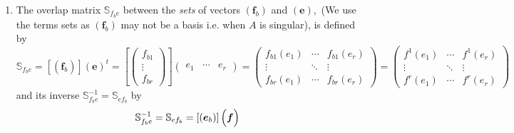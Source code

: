 \documentclass[aps,preprint]{revtex4}
\begin{document}
\begin{enumerate}
\begin{enumerate}
\begin{equation}
\begin{array}{ccc}
\vdots & \ddots & \vdots \\ 
e_{bbr}\left( f_{b1}\right) & \cdots & e_{bbr}\left( f_{b1}\right)%
\end{array}%
\right) =\left( 
\begin{array}{ccc}
f_{b1}\left( e_{1}\right) & \cdots & f_{b1}\left( e_{r}\right) \\ 
\vdots & \ddots & \vdots \\ 
f_{br}\left( e_{1}\right) & \cdots & f_{br}\left( e_{r}\right)%
\end{array}%
\right) =\mathcal{R}_{e}\left( A\right) .
\end{equation}

\item The overlap matrix $\mathbb{S}_{f_{b}e}$ between the \emph{sets} of
vectors $\left( \boldsymbol{f}_{b}\right) $ and $\left( \boldsymbol{e}%
\right) ,$ (We use the terms sets as $\left( \boldsymbol{f}_{b}\right) $ may
not be a basis i.e. when $A$ is singular), is defined by 
\begin{equation}
\mathbb{S}_{f_{b}e}=\left[ \left( \overset{}{\boldsymbol{f}_{b}}\right) %
\right] \left( \overset{}{\boldsymbol{e}}\right) ^{t}=\left[ \left( 
\begin{array}{c}
f_{b1} \\ 
\vdots \\ 
f_{br}%
\end{array}%
\right) \right] \left( 
\begin{array}{ccc}
e_{1} & \cdots & e_{r}%
\end{array}%
\right) =\left( 
\begin{array}{ccc}
f_{b1}\left( e_{1}\right) & \cdots & f_{b1}\left( e_{r}\right) \\ 
\vdots & \ddots & \vdots \\ 
f_{br}\left( e_{1}\right) & \cdots & f_{br}\left( e_{r}\right)%
\end{array}%
\right) =\left( 
\begin{array}{ccc}
f^{1}\left( e_{1}\right) & \cdots & f^{1}\left( e_{r}\right) \\ 
\vdots & \ddots & \vdots \\ 
f^{r}\left( e_{1}\right) & \cdots & f^{r}\left( e_{r}\right)%
\end{array}%
\right)
\end{equation}%
and its inverse $\mathbb{S}_{f_{b}e}^{-1}=\mathbb{S}_{ef_{b}}$ by 
\begin{equation}
\mathbb{S}_{f_{b}e}^{-1}=\mathbb{S}_{ef_{b}}=\left[ \left( \overset{}{%
\boldsymbol{e}_{b}}\right) \right] \left( \overset{}{\boldsymbol{f}}\right)

\end{equation}
\end{enumerate}
\end{enumerate}
\end{document}
